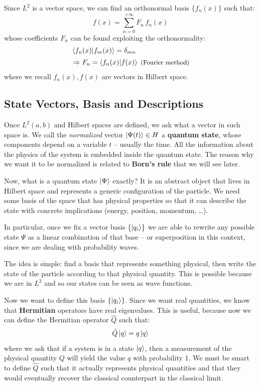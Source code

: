 \documentclass[12pt,a4paper]{article}
\begin{document}
Since $L^2$ is a vector space, we can find an orthonormal basis $\{f_n(x)\}$ such that:
\begin{equation}
	f(x) = \sum_{n=0}^{+\infty} F_n \, f_n(x)
\end{equation}
whose coefficients $F_n$ can be found exploiting the orthonormality:
\begin{align*}
	&\braket{f_n(x)}{f_m(x)} = \delta_{mn} \\[2pt]
	&\Rightarrow F_n = \braket{f_n(x)}{f(x)} \; \text{\small{(Fourier method)}}
\end{align*}
where we recall $f_n(x), f(x)$ are vectors in Hilbert space.

\subsection{State Vectors, Basis and Descriptions}
Once $L^2(a,b)$ and Hilbert spaces are defined, we ask what a vector in such space
is. We call the \textit{normalized} vector $\ket{\Psi(t)}\in H$ a
\textbf{quantum state}, whose components depend on a variable $t$ -- usually the
time. All the information about the physics of the system is embedded inside
the quantum state.
The reason why we want it to be normalized is related to \textbf{Born's rule} that
we will see later. 

Now, what is a quantum state $\ket{\Psi}$ exactly? It is an abstract object that lives in Hilbert
space and represents a generic configuration of the particle. We need some basis
of the space that has physical properties so that it can describe the state with
concrete implications (energy, position, momentum, \dots).

In particular, once we fix a vector basis $\{\ket{q_i}\}$ we are able to
rewrite any possible state $\Psi$ as a linear combination of that base --
or superposition in this context, since we are dealing with probability waves. 

The idea is simple: find a basis that represents something physical, then write the
state of the particle according to that physical quantity.
This is possible because we are in $L^2$ and so our states can be seen as wave
functions.

Now we want to define this basis $\{\ket{q_i}\}$. Since we want real quantities,
we know that \textbf{Hermitian} operators have real eigenvalues. This is useful, because
now we can define the Hermitian operator $\hat{Q}$ such that:  
\begin{equation}
    \hat{Q} \ket{q} = q \ket{q}
\end{equation}
where we ask that if a system is in a state $\ket{q}$, then a measurement of the
physical quantity $Q$ will yield the value $q$ with probability 1.
We must be smart to define $\hat{Q}$ such that it actually represents physical quantities
and that they would eventually recover the classical counterpart in the classical limit.
\end{document}
